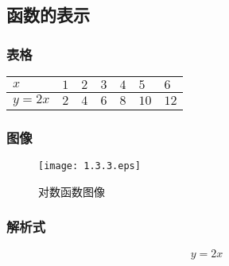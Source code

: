 \documentclass[12pt, a4paper, oneside, UTF8]{ctexbook}  %
\begin{document}
\begin{sloppypar}
    \subsection{函数的表示}
    \subsubsection{表格}
    \begin{table}[H]
        \begin{center}
            \begin{tabular}{|l|l|l|l|l|l|l|}
                \hline
                $x$    & $ 1$ & $2$ & $3$ & $4$ & $5$  & $6$  \\ \hline
                $y=2x$ & $2$  & $4$ & $6$ & $8$ & $10$ & $12$ \\ \hline
            \end{tabular}
        \end{center}
    \end{table}
    \subsubsection{图像}
    \begin{figure}[H]
        \centering \texttt{[image: 1.3.3.eps]} \caption{对数函数图像}
    \end{figure}
    \subsubsection{解析式}
    $$
        \boxed{y=2x}
    $$

\end{sloppypar}
\end{document}
